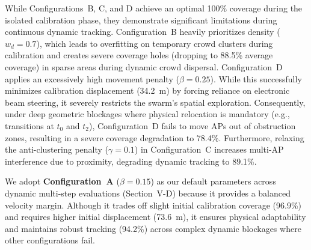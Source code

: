 While Configurations~B, C, and D achieve an optimal 100\% coverage during the isolated calibration phase, they demonstrate significant limitations during continuous dynamic tracking. Configuration~B heavily prioritizes density ($w_d=0.7$), which leads to overfitting on temporary crowd clusters during calibration and creates severe coverage holes (dropping to 88.5\% average coverage) in sparse areas during dynamic crowd dispersal. Configuration~D applies an excessively high movement penalty ($\beta = 0.25$). While this successfully minimizes calibration displacement (34.2~m) by forcing reliance on electronic beam steering, it severely restricts the swarm's spatial exploration. Consequently, under deep geometric blockages where physical relocation is mandatory (e.g., transitions at $t_0$ and $t_2$), Configuration~D fails to move APs out of obstruction zones, resulting in a severe coverage degradation to 78.4\%. Furthermore, relaxing the anti-clustering penalty ($\gamma=0.1$) in Configuration~C increases multi-AP interference due to proximity, degrading dynamic tracking to 89.1\%.

We adopt \textbf{Configuration~A} ($\beta=0.15$) as our default parameters across dynamic multi-step evaluations (Section~V-D) because it provides a balanced velocity margin. Although it trades off slight initial calibration coverage (96.9\%) and requires higher initial displacement (73.6~m), it ensures physical adaptability and maintains robust tracking (94.2\%) across complex dynamic blockages where other configurations fail.
